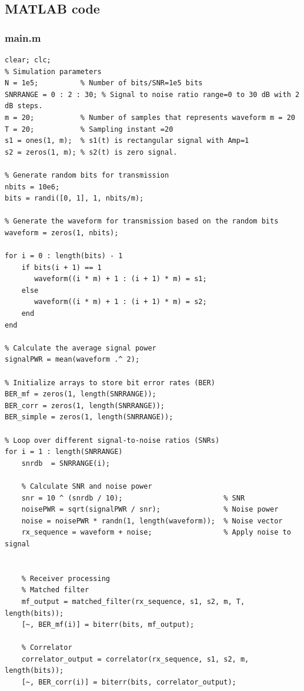 \documentclass[a4paper, 12pt, english]{article}
\begin{document}
\newpage
\subsection{MATLAB code}
\subsubsection{main.m}
\begin{lstlisting}[style=matlab]
clear; clc;
% Simulation parameters
N = 1e5;          % Number of bits/SNR=1e5 bits
SNRRANGE = 0 : 2 : 30; % Signal to noise ratio range=0 to 30 dB with 2 dB steps.
m = 20;           % Number of samples that represents waveform m = 20
T = 20;           % Sampling instant =20
s1 = ones(1, m);  % s1(t) is rectangular signal with Amp=1
s2 = zeros(1, m); % s2(t) is zero signal.

% Generate random bits for transmission
nbits = 10e6;
bits = randi([0, 1], 1, nbits/m);

% Generate the waveform for transmission based on the random bits
waveform = zeros(1, nbits);

for i = 0 : length(bits) - 1
    if bits(i + 1) == 1
       waveform((i * m) + 1 : (i + 1) * m) = s1;
    else
       waveform((i * m) + 1 : (i + 1) * m) = s2;
    end
end

% Calculate the average signal power
signalPWR = mean(waveform .^ 2);

% Initialize arrays to store bit error rates (BER)
BER_mf = zeros(1, length(SNRRANGE));
BER_corr = zeros(1, length(SNRRANGE));
BER_simple = zeros(1, length(SNRRANGE));

% Loop over different signal-to-noise ratios (SNRs)
for i = 1 : length(SNRRANGE)
    snrdb  = SNRRANGE(i);

    % Calculate SNR and noise power
    snr = 10 ^ (snrdb / 10);                        % SNR
    noisePWR = sqrt(signalPWR / snr);               % Noise power
    noise = noisePWR * randn(1, length(waveform));  % Noise vector
    rx_sequence = waveform + noise;                 % Apply noise to signal
    
    
    % Receiver processing
    % Matched filter
    mf_output = matched_filter(rx_sequence, s1, s2, m, T, length(bits));
    [~, BER_mf(i)] = biterr(bits, mf_output);

    % Correlator
    correlator_output = correlator(rx_sequence, s1, s2, m, length(bits));
    [~, BER_corr(i)] = biterr(bits, correlator_output);
    

\end{lstlisting}
\end{document}
